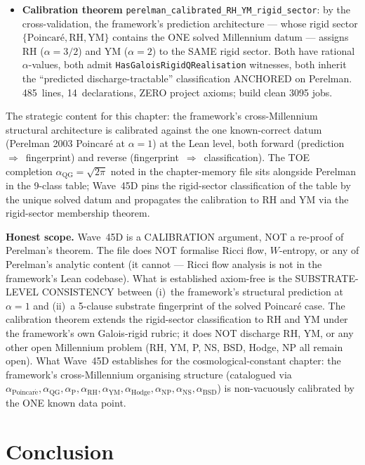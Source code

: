 \begin{remark}
\begin{itemize}
  \item \textbf{Calibration theorem} \texttt{perelman\_calibrated\_RH\_YM\_rigid\_sector}: by the cross-validation, the framework's prediction architecture --- whose rigid sector $\{\text{Poincar\'e}, \mathrm{RH}, \mathrm{YM}\}$ contains the ONE solved Millennium datum --- assigns RH ($\alpha = 3/2$) and YM ($\alpha = 2$) to the SAME rigid sector. Both have rational $\alpha$-values, both admit \texttt{HasGaloisRigidQRealisation} witnesses, both inherit the ``predicted discharge-tractable'' classification ANCHORED on Perelman. 485~lines, 14~declarations, ZERO project axioms; build clean 3095 jobs.
\end{itemize}
The strategic content for this chapter: the framework's cross-Millennium structural architecture is calibrated against the one known-correct datum (Perelman 2003 Poincar\'e at $\alpha = 1$) at the Lean level, both forward (prediction~$\Rightarrow$~fingerprint) and reverse (fingerprint~$\Rightarrow$~classification). The TOE completion $\alpha_{\mathrm{QG}} = \sqrt{2\pi}$ noted in the chapter-memory file sits alongside Perelman in the 9-class table; Wave~45D pins the rigid-sector classification of the table by the unique solved datum and propagates the calibration to RH and YM via the rigid-sector membership theorem.

\textbf{Honest scope.} Wave~45D is a CALIBRATION argument, NOT a re-proof of Perelman's theorem. The file does NOT formalise Ricci flow, $W$-entropy, or any of Perelman's analytic content (it cannot --- Ricci flow analysis is not in the framework's Lean codebase). What is established axiom-free is the SUBSTRATE-LEVEL CONSISTENCY between (i)~the framework's structural prediction at $\alpha = 1$ and (ii)~a 5-clause substrate fingerprint of the solved Poincar\'e case. The calibration theorem extends the rigid-sector classification to RH and YM under the framework's own Galois-rigid rubric; it does NOT discharge RH, YM, or any other open Millennium problem (RH, YM, P, NS, BSD, Hodge, NP all remain open). What Wave~45D establishes for the cosmological-constant chapter: the framework's cross-Millennium organising structure (catalogued via $\alpha_{\mathrm{Poincar\acute{e}}}, \alpha_{\mathrm{QG}}, \alpha_{\mathrm{P}}, \alpha_{\mathrm{RH}}, \alpha_{\mathrm{YM}}, \alpha_{\mathrm{Hodge}}, \alpha_{\mathrm{NP}}, \alpha_{\mathrm{NS}}, \alpha_{\mathrm{BSD}}$) is non-vacuously calibrated by the ONE known data point.
\end{remark}

\section{Conclusion}

